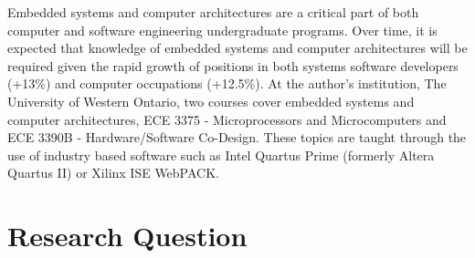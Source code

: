 \begin{comment}
\item Has anyone else done anything similar?
\begin{itemize}
\item Yes. 
\end{itemize}
\item Is your research relevant to research/practice/theory in your field?
\begin{itemize}
\item Education is always required
\item Improvements are required as IoT increases and devices are moving back towards small
microelectronics
\end{itemize}
\item What is already known or understood about this topic?
\begin{itemize}
\item Simulations: \cite{Tappan2009}, \cite{Skrien2001}, \cite{Skillen2011}
\item Curriculum: 
\end{itemize}
\item How might your research add to this understanding, or challenge existing theories and beliefs?
\begin{itemize}
\item Extend on existing solution
\item Propose opportunity to replace multiple configurations, not a single one
\end{itemize}
\end{itemize}
\end{comment}

Embedded systems and computer architectures are a critical part of both computer and software engineering undergraduate programs\cite[appendix, p.~73-76]{cec2016}\cite[p.~33]{sec2015}\cite{ece-ce-program, Ristov2011, Stolikj2011}. Over time, it is expected that knowledge of embedded systems and computer architectures will be required given the rapid growth of positions in both systems software developers (+13\%) and computer occupations (+12.5\%)\cite{bls2014}. At the author's institution, The University of Western Ontario, two courses cover embedded systems and computer architectures, ECE 3375 - Microprocessors and Microcomputers and ECE 3390B - Hardware/Software Co-Design\cite{eceOutlines}. These topics are taught through the use of industry based software such as Intel Quartus Prime (formerly Altera Quartus II)\cite{quartus} or Xilinx ISE WebPACK\cite{xilinxISE}.

\section{Research Question}

